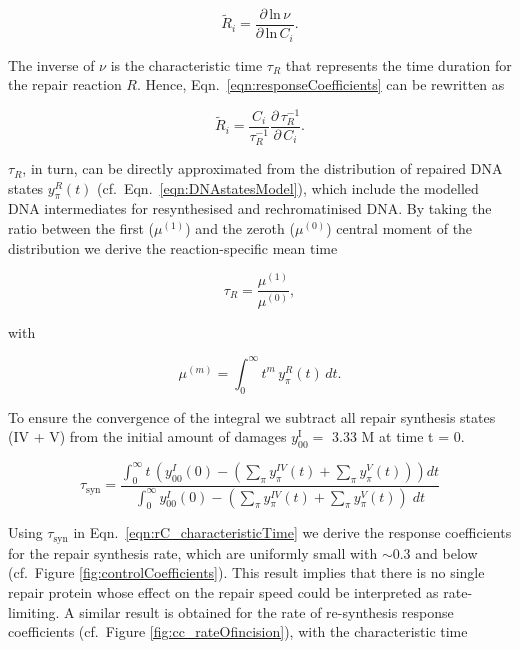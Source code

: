 \begin{equation}
\tilde{R}_i = \frac{\partial \, \text{ln} \, \nu}{\partial \, \text{ln} \, C_i}.
\label{eqn:responseCoefficients}
\end{equation}

The inverse of $\nu$ is the characteristic time $\tau_R$ that represents the time duration for the repair reaction $R$. Hence, Eqn.\ \ref{eqn:responseCoefficients} can be rewritten as

\begin{equation}
\tilde{R}_i = \frac{C_i}{\tau_R^{-1}} \frac{\partial  \, \tau_R^{-1}}{\partial \,  C_i}.
\label{eqn:rC_characteristicTime}   
\end{equation}

$\tau_R$, in turn, can be directly approximated from the distribution of repaired DNA states $y^R_\pi(t)$ (cf.\ Eqn.\ \ref{eqn:DNAstatesModel}), which include the modelled DNA intermediates for resynthesised and rechromatinised DNA. By taking the ratio between the first ($\mu^{(1)}$) and the zeroth ($\mu^{(0)}$) central moment of the distribution we derive the reaction-specific mean time 

\begin{equation}
\tau_{R} = \frac{\mu^{(1)}}{\mu^{(0)}}, 
\label{eqn:meanreactiontime}   
\end{equation}

with

\begin{equation}
\mu^{(m)} = \int_0^\infty t^m \, y^R_\pi(t)\, dt.
\label{eqn:moments}   
\end{equation}


To ensure the convergence of the integral we subtract all repair synthesis states (IV + V) from the initial amount of damages $y^{\text{I}}_{00} = $ 3.33 \textmu M at time t = 0.

\begin{equation}	
\tau_{\text{syn}}=\frac{\int_0^\infty t \, (y^I_{00}(0)-( \sum_ \pi  y_\pi^{IV}(t)+\sum_ \pi  y_\pi^{V}(t))) dt}{\int_0^\infty y^I_{00}(0)-( \sum_ \pi  y_\pi^{IV}(t)+\sum_ \pi  y_\pi^{V}(t))\; dt}
\end{equation}

Using $\tau_{\text{syn}}$ in Eqn.\ \ref{eqn:rC_characteristicTime} we derive the response coefficients for the repair synthesis rate, which are uniformly small with $\sim$0.3 and below (cf.\ Figure \ref{fig:controlCoefficients}). This result implies that there is no single repair protein whose effect on the repair speed could be interpreted as rate-limiting. A similar result is obtained for the rate of re-synthesis response coefficients (cf.\ Figure \ref{fig:cc_rateOfincision}), with the characteristic time

